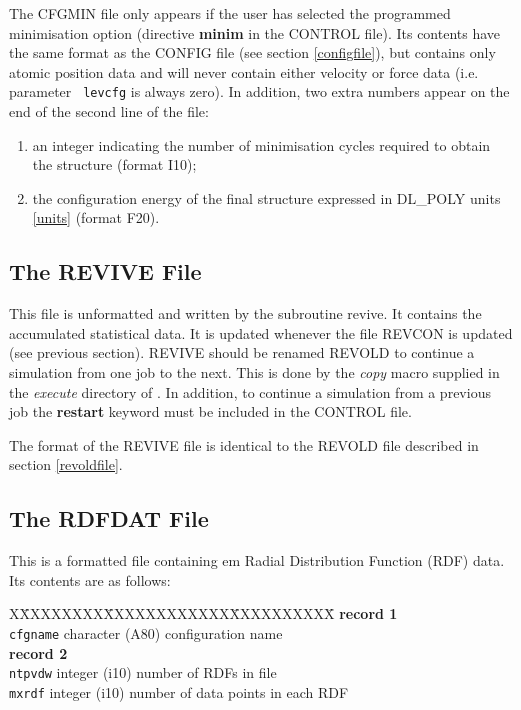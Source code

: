 The CFGMIN file only appears if the user has selected the programmed
minimisation option (directive {\bf minim} in the CONTROL file). Its
contents have the same format as the CONFIG file (see section
\ref{configfile}), but contains only atomic position data and will
never contain either velocity or force data (i.e. parameter {\tt
levcfg} is always zero).  In addition, two extra numbers appear on the
end of the second line of the file:
\begin{enumerate}
\item an integer indicating the number of minimisation cycles required
to obtain the structure (format I10);
\item the configuration energy of the final structure expressed in 
DL\_POLY units \ref{units} (format F20).
\end{enumerate}

\subsection{The REVIVE File}
\label{revivefile}

This file is unformatted and written by the subroutine {\sc revive}.
It contains the accumulated statistical data. It is updated whenever
the file REVCON is updated (see previous section). REVIVE should be
renamed REVOLD to continue a simulation from one job to
the next.  This is done by the {\sl copy} macro supplied in the
{\em execute} directory of \D{}. In addition, to continue a 
simulation from a previous job the {\bf restart} keyword must be
included in the CONTROL file.

The format of the REVIVE file is identical to the REVOLD file
described in section \ref{revoldfile}.

\subsection{The RDFDAT File}
\label{rdffile}

This is a formatted file containing {em Radial Distribution Function}
(RDF) data. Its contents are as follows:

\begin{tabbing}
X\=XXXXXXXX\=XXXXXXXXXXXX\=XXXXXXXXXX\=\kill
{\bf record 1}\\
\> {\tt cfgname} \> character (A80)\> configuration name\\
{\bf record 2}\\
\> {\tt ntpvdw} \> integer (i10) \> number of RDFs in file\\
\> {\tt mxrdf} \> integer (i10) \> number of data points in each RDF\\
\end{tabbing}


